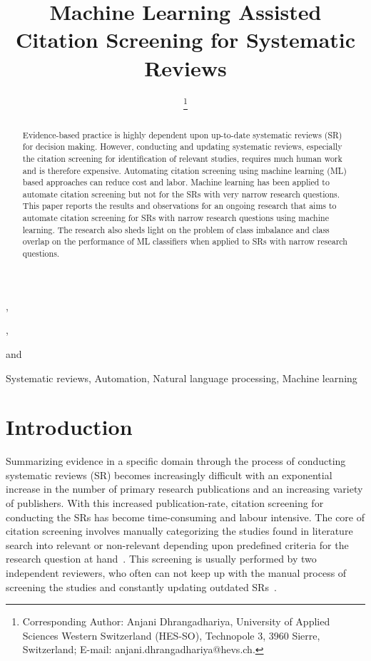 \documentclass{IOS-Book-Article}
\begin{document}
\begin{frontmatter}              %
\title{Machine Learning Assisted Citation
 Screening for Systematic Reviews}
%
\author[A]{ %
\thanks{Corresponding Author: Anjani Dhrangadhariya, University of Applied Sciences Western Switzerland (HES-SO), Technopole 3,
3960 Sierre, Switzerland; E-mail:
anjani.dhrangadhariya@hevs.ch.}},
\author[B]{ }
,
\author[A]{ }
and
\author[A,C]{ }
%
\address[A]{University of Applied Sciences Western Switzerland (HES-SO), Sierre, Switzerland}
\address[B]{School of Health Sciences, HES-SO Valais-Wallis, Leukerbad, Switzerland}
\address[C]{University of Geneva (UNIGE), Geneva, 
 Switzerland}
%
\begin{abstract}
Evidence-based practice is highly dependent upon up-to-date systematic reviews (SR) for decision making.
However, conducting and updating systematic reviews, especially the citation screening for identification of relevant studies, requires much human work and is therefore expensive.
Automating citation screening using machine learning (ML) based approaches can reduce cost and labor.
Machine learning has been applied to automate citation screening but not for the SRs with very narrow research questions.
This paper reports the results and observations for an ongoing research that aims to automate citation screening for SRs with narrow research questions using machine learning.
The research also sheds light on the problem of class imbalance and class overlap on the performance of ML classifiers when applied to SRs with narrow research questions.
\end{abstract}
%
\begin{keyword}
Systematic reviews, Automation, Natural language processing, Machine learning
\end{keyword}
\end{frontmatter}
%
\thispagestyle{empty}
\pagestyle{empty}
%
\section{Introduction}
%
Summarizing evidence in a specific domain through the process of conducting systematic reviews (SR) becomes increasingly difficult with an exponential increase in the number of primary research publications and an increasing variety of publishers.
With this increased publication-rate, citation screening for conducting the SRs has become  time-consuming and labour intensive.
The core of citation screening involves manually categorizing the studies found in literature search into relevant or non-relevant depending upon predefined criteria for the research question at hand~\cite{cochraneHandbook}.
This screening is usually performed by two independent reviewers, who often can not keep up with the manual process of screening the studies and constantly updating outdated SRs~\cite{pmid22587960}.
\end{document}

